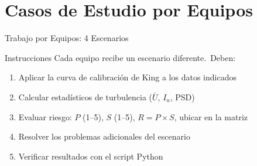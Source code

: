 \documentclass[aspectratio=169,12pt]{beamer}
\begin{document}
\section{Casos de Estudio por Equipos}

\begin{frame}{Trabajo por Equipos: 4 Escenarios}
	\begin{block}{Instrucciones}
		Cada equipo recibe un escenario diferente.\ Deben:
		\begin{enumerate}
			\item Aplicar la curva de calibración de King
			      a los datos indicados
			\item Calcular estadísticos de turbulencia
			      ($\bar{U}$, $I_u$, PSD)
			\item Evaluar riesgo: $P$ (1--5), $S$ (1--5),
			      $R = P \times S$, ubicar en la matriz
			\item Resolver los problemas adicionales del escenario
			\item Verificar resultados con el script Python
		\end{enumerate}
	\end{block}
\end{frame}
\end{document}
